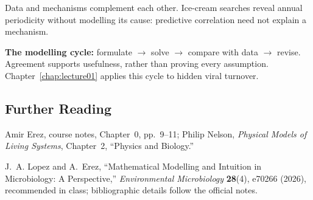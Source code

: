 Data and mechanisms complement each other. Ice-cream searches reveal annual periodicity without modelling its cause: predictive correlation need not explain a mechanism.

\textbf{The modelling cycle:} formulate $\to$ solve $\to$ compare with data $\to$ revise. Agreement supports usefulness, rather than proving every assumption. Chapter~\ref{chap:lecture01} applies this cycle to hidden viral turnover.

\subsection*{Further Reading}
\begingroup\small
Amir Erez, course notes, Chapter~0, pp.~9--11; Philip Nelson, \emph{Physical Models of Living Systems}, Chapter~2, ``Physics and Biology.''

J.~A. Lopez and A.~Erez, ``Mathematical Modelling and Intuition in Microbiology: A Perspective,'' \emph{Environmental Microbiology} \textbf{28}(4), e70266 (2026), recommended in class; bibliographic details follow the official notes.
\endgroup
